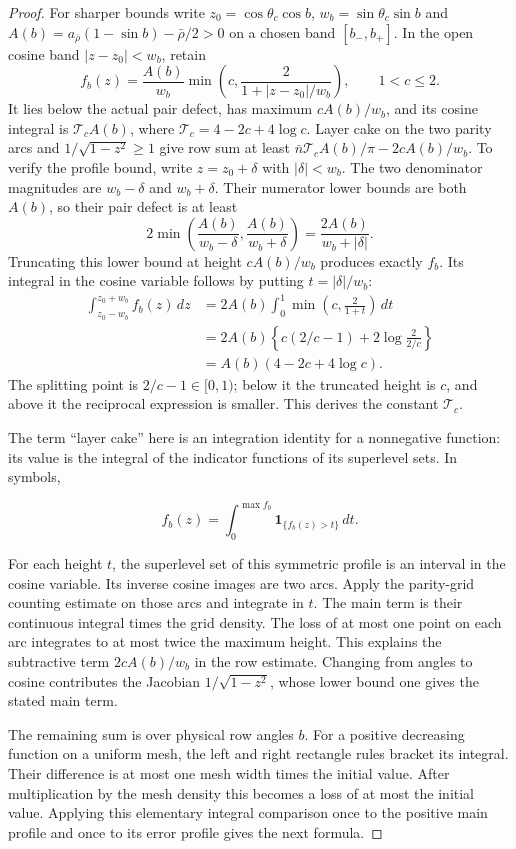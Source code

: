 \begin{proof}
For sharper bounds write $z_0=\cos\theta_c\cos b$,
$w_b=\sin\theta_c\sin b$ and $A(b)=a_{\bar{\rho}}(1-\sin b)-\bar{\rho}/2>0$ on a chosen
band $[b_-,b_+]$.  In the open cosine band $|z-z_0|<w_b$, retain
\[
 f_b(z)=\frac{A(b)}{w_b}
       \min\left(c,\frac2{1+|z-z_0|/w_b}\right),\qquad 1<c\leq2.
\]
It lies below the actual pair defect, has maximum $cA(b)/w_b$, and
its cosine integral is $\mathcal T_cA(b)$, where
$\mathcal T_c=4-2c+4\log c$.  Layer cake on the two parity arcs and
$1/\sqrt{1-z^2}\geq1$ give row sum at least
$\bar{n}\mathcal T_cA(b)/\pi-2cA(b)/w_b$.
To verify the profile bound, write $z=z_0+\delta$ with
$|\delta|<w_b$.  The two denominator magnitudes are
$w_b-\delta$ and $w_b+\delta$.  Their numerator lower bounds
are both $A(b)$, so their pair defect is at least
\[
 2\min\left(\frac{A(b)}{w_b-\delta},
             \frac{A(b)}{w_b+\delta}\right)
       =\frac{2A(b)}{w_b+|\delta|}.
\]
Truncating this lower bound at height $cA(b)/w_b$ produces exactly
$f_b$.  Its integral in the cosine variable follows by putting
$t=|\delta|/w_b$:
\[
 \begin{aligned}
 \int_{z_0-w_b}^{z_0+w_b}f_b(z)\,dz
 &=2A(b)\int_0^1\min\left(c,\frac2{1+t}\right)\,dt\\
 &=2A(b)\left\{c(2/c-1)
                     +2\log\frac{2}{2/c}\right\}\\
 &=A(b)(4-2c+4\log c).
 \end{aligned}
\]
The splitting point is $2/c-1\in[0,1)$; below it the truncated
height is $c$, and above it the reciprocal expression is smaller.
This derives the constant $\mathcal T_c$.

The term ``layer cake'' here is an integration identity for a
nonnegative function: its value is the integral of the indicator
functions of its superlevel sets.  In symbols,

\[
 f_b(z)=\int_0^{\max f_b}\mathbf 1_{\{f_b(z)>t\}}\,dt.
\]

For each height $t$, the superlevel set of this symmetric profile
is an interval in the cosine variable.  Its inverse cosine images
are two arcs.  Apply the parity-grid counting estimate on those
arcs and integrate in $t$.  The main term is their continuous
integral times the grid density.  The loss of at most one point on
each arc integrates to at most twice the maximum height.  This
explains the subtractive term $2cA(b)/w_b$ in the row estimate.
Changing from angles to cosine contributes the Jacobian
$1/\sqrt{1-z^2}$, whose lower bound one gives the stated main term.

The remaining sum is over physical row angles $b$.  For a positive
decreasing function on a uniform mesh, the left and right rectangle
rules bracket its integral.  Their difference is at most one mesh
width times the initial value.  After multiplication by the mesh
density this becomes a loss of at most the initial value.  Applying
this elementary integral comparison once to the positive main
profile and once to its error profile gives the next formula.


\end{proof}
